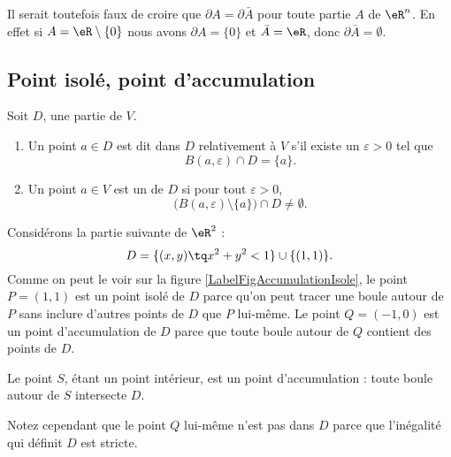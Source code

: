 \begin{remark}
    Il serait toutefois faux de croire que \( \partial A=\partial \bar A\) pour toute partie \( A\) de \( \eR^n\). En effet si \( A=\eR\setminus\{ 0 \}\) nous avons \( \partial A=\{ 0 \}\) et \( \bar A=\eR\), donc \( \partial \bar A=\emptyset\).
\end{remark}

\subsection{Point isolé, point d'accumulation}

\begin{definition}
	Soit $D$, une partie de $V$.
	\begin{enumerate}
		\item
			Un point $a\in D$ est dit  dans $D$ relativement à $V$ s'il existe un $\varepsilon>0$ tel que
			\begin{equation}
				B(a,\varepsilon)\cap D=\{ a \}.
			\end{equation}
		\item
			Un point $a\in V$ est un  de $D$ si pour tout $\varepsilon>0$,
			\begin{equation}
				\Big( B(a,\varepsilon)\setminus\{ a \}\Big)\cap D\neq \emptyset.
			\end{equation}
	\end{enumerate}
\end{definition}

\newcommand{\CaptionFigAccumulationIsole}{L'ensemble décrit par l'équation \eqref{Eq2807BouleIso}. Le point $P$ est un point isolé de $D$, tandis que  les points $S$ et $Q$ sont des points d'accumulation.}


\begin{example}
	Considérons la partie suivante de $\eR^2$ :
	\begin{equation}	\label{Eq2807BouleIso}
		D=\{ (x,y)\tq x^2+y^2<1\}\cup\{ (1,1) \}.
	\end{equation}
	Comme on peut le voir sur la figure \ref{LabelFigAccumulationIsole}, le point $P=(1,1)$ est un point isolé de $D$ parce qu'on peut tracer une boule autour de $P$ sans inclure d'autres points de $D$ que $P$ lui-même. Le point $Q=(-1,0)$ est un point d'accumulation de $D$ parce que toute boule autour de $Q$ contient des points de $D$.

    Le point $S$, étant un point intérieur, est un point d'accumulation : toute boule autour de $S$ intersecte $D$.
    
    Notez cependant que le point $Q$ lui-même n'est pas dans $D$ parce que l'inégalité qui définit $D$ est stricte.
\end{example}

